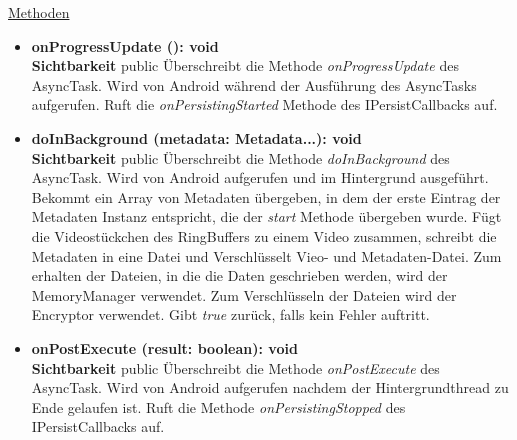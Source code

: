 \underline{Methoden}
\begin{itemize}
\itemsep0pt

\item \textbf{onProgressUpdate (): void}\hfill\\
\textbf{Sichtbarkeit} public\newline
Überschreibt die Methode \textit{onProgressUpdate} des AsyncTask. Wird von Android während der Ausführung des AsyncTasks aufgerufen. Ruft die \textit{onPersistingStarted} Methode des IPersistCallbacks auf.

\item \textbf{doInBackground (metadata: Metadata...): void}\hfill\\
\textbf{Sichtbarkeit} public\newline
Überschreibt die Methode \textit{doInBackground} des AsyncTask. Wird von Android aufgerufen und im Hintergrund ausgeführt. Bekommt ein Array von Metadaten übergeben, in dem der erste Eintrag der Metadaten Instanz entspricht, die der \textit{start} Methode übergeben wurde. Fügt die Videostückchen des RingBuffers zu einem Video zusammen, schreibt die Metadaten in eine Datei und Verschlüsselt Vieo- und Metadaten-Datei. Zum erhalten der Dateien, in die die Daten geschrieben werden, wird der MemoryManager verwendet. Zum Verschlüsseln der Dateien wird der Encryptor verwendet. Gibt \textit{true} zurück, falls kein Fehler auftritt.

\item \textbf{onPostExecute (result: boolean): void}\hfill\\
\textbf{Sichtbarkeit} public\newline
Überschreibt die Methode \textit{onPostExecute} des AsyncTask. Wird von Android aufgerufen nachdem der Hintergrundthread zu Ende gelaufen ist. Ruft die Methode \textit{onPersistingStopped} des IPersistCallbacks auf.

\end{itemize}